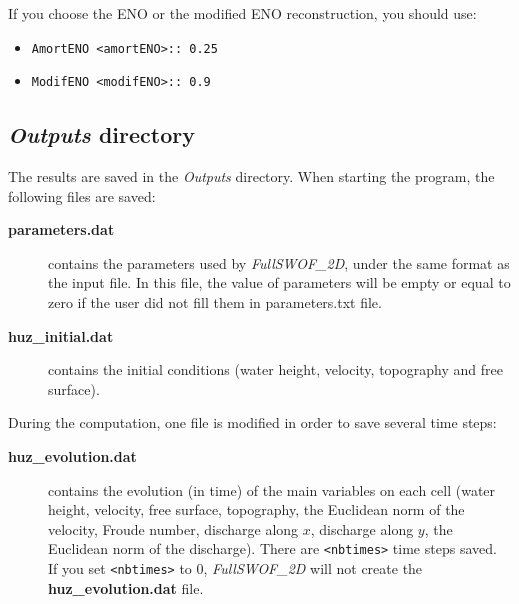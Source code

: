 \documentclass[a4paper, 11pt]{article}
\newcommand{\FullSWOF}{\emph{FullSWOF\_2D}}
\begin{document}
If you choose the ENO or the modified ENO reconstruction, you should use:
\begin{itemize}
\item \texttt{AmortENO <amortENO>:: 0.25}
\item \texttt{ModifENO <modifENO>:: 0.9}
\end{itemize}

\subsection{\emph{Outputs} directory}\label{sec:outputs}

The results are saved in the \textit{Outputs} directory. When starting the program, the following files are saved:
\begin{description}
	\item[\textbf{parameters.dat}] contains the parameters used by \FullSWOF, under the same format as the input file. In this file, the value of parameters will be empty or equal to zero if the user did not fill them in parameters.txt file. 
	\item[\textbf{huz\_initial.dat}] contains the initial conditions (water height, velocity, topography and free surface).
\end{description}
During the computation, one file is modified in order to save several time steps:
\begin{description}
	\item[\textbf{huz\_evolution.dat}] contains the evolution (in time) of the main variables on each cell (water height, velocity, free surface, topography, the Euclidean norm of the velocity, Froude number, discharge along $x$, discharge along $y$, the Euclidean norm of the discharge).
	There are \texttt{<nbtimes>} time steps saved.\\
	If you set \texttt{<nbtimes>} to 0, \FullSWOF{} will not create the \textbf{huz\_evolution.dat} file.
\end{description}
\end{document}
